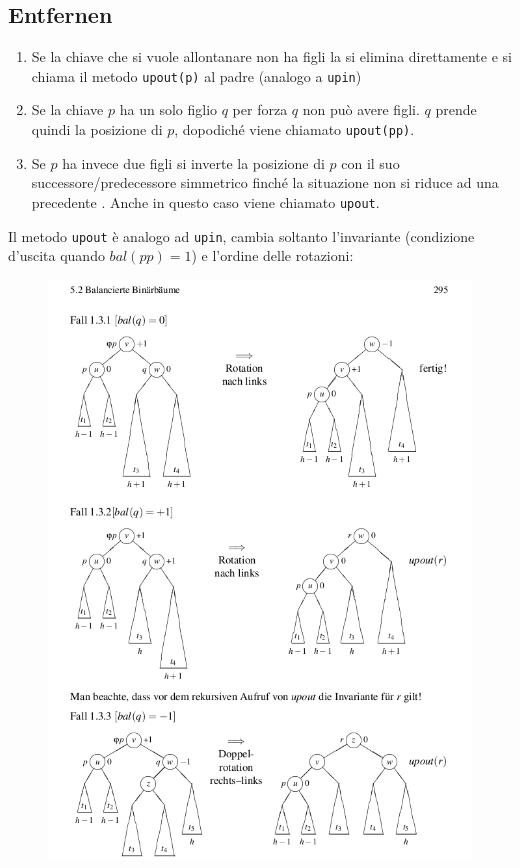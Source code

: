 \documentclass[a4paper]{book}
\newcommand{\inline}[1]{\lstinline!#1!}%
\begin{document}
\subsection*{Entfernen}
\begin{enumerate}
\item Se la chiave che si vuole allontanare non ha figli la si elimina direttamente e si chiama il metodo \inline{upout(p)} al padre (analogo a \inline{upin})
\item Se la chiave $p$ ha un solo figlio $q$ per forza $q$ non può avere figli. $q$ prende quindi la posizione di $p$, dopodiché viene chiamato \inline{upout(pp)}.
\item Se $p$ ha invece due figli si inverte la posizione di $p$ con il suo successore/predecessore simmetrico finché la situazione non si riduce ad una precedente . Anche in questo caso viene chiamato \inline{upout}.
\end{enumerate}
Il metodo \inline{upout} è analogo ad \inline{upin}, cambia soltanto l'invariante (condizione d'uscita quando $bal(pp)=1$) e l'ordine delle rotazioni:
\begin{figure}[H]
\centering
\includegraphics[scale=0.48]{Figures/avldeletion.png}
\end{figure}
\end{document}
